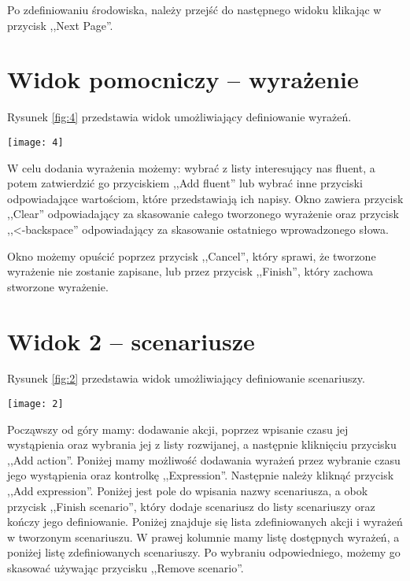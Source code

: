 \documentclass{mini}
\begin{document}
Po zdefiniowaniu środowiska, należy przejść do następnego widoku klikając w przycisk ,,Next Page''.

\chapter{Widok pomocniczy -- wyrażenie}
\label{chap:pom}

Rysunek \ref{fig:4} przedstawia widok umożliwiający definiowanie wyrażeń.

\begin{center}
  \texttt{[image: 4]}
   \label{fig:4}
\end{center}

W celu dodania wyrażenia możemy:
wybrać z listy interesujący nas fluent, a potem zatwierdzić go przyciskiem ,,Add fluent'' lub wybrać inne przyciski odpowiadające wartościom, które przedstawiają ich napisy. 
Okno zawiera przycisk ,,Clear'' odpowiadający za skasowanie całego tworzonego wyrażenie oraz przycisk ,,<-backspace'' odpowiadający za skasowanie ostatniego wprowadzonego słowa.

Okno możemy opuścić poprzez przycisk ,,Cancel'', który sprawi, że tworzone wyrażenie nie zostanie zapisane, lub przez przycisk ,,Finish'', który zachowa stworzone wyrażenie.



\chapter{Widok 2 -- scenariusze}

Rysunek \ref{fig:2} przedstawia widok umożliwiający definiowanie scenariuszy.

\begin{center}
  \texttt{[image: 2]}
   \label{fig:2}
\end{center}

Począwszy od góry mamy: dodawanie akcji, poprzez wpisanie czasu jej wystąpienia oraz wybrania jej z listy rozwijanej, a następnie kliknięciu  przycisku ,,Add action''.
Poniżej mamy możliwość dodawania wyrażeń przez wybranie czasu jego wystąpienia oraz kontrolkę ,,Expression''. Następnie należy kliknąć przycisk ,,Add expression''.
Poniżej jest pole do wpisania nazwy scenariusza, a obok przycisk ,,Finish scenario'', który dodaje scenariusz do listy scenariuszy oraz kończy jego definiowanie.
Poniżej znajduje się lista zdefiniowanych akcji i wyrażeń w tworzonym scenariuszu. W prawej kolumnie mamy listę dostępnych wyrażeń, a poniżej listę zdefiniowanych scenariuszy. Po wybraniu odpowiedniego, możemy go skasować używając przycisku ,,Remove scenario''.
\end{document}
